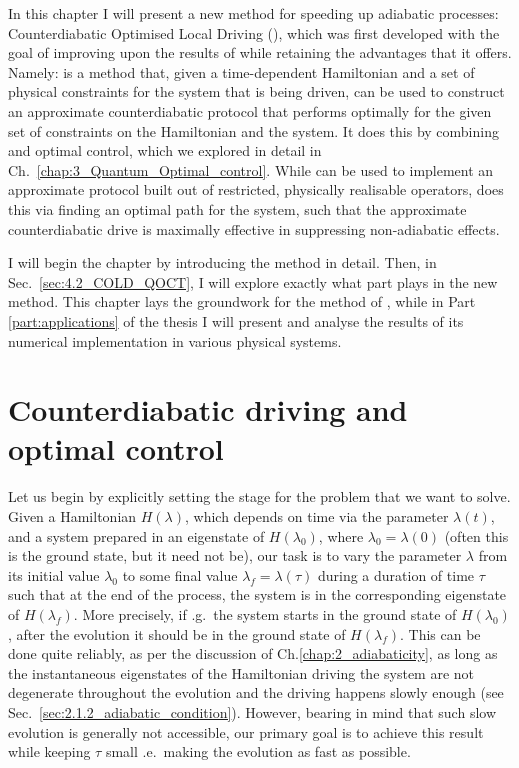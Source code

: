 In this chapter I will present a new method for speeding up adiabatic processes: Counterdiabatic Optimised Local Driving (), which was first developed with the goal of improving upon the results of  while retaining the advantages that it offers. Namely:  is a method that, given a time-dependent Hamiltonian and a set of physical constraints for the system that is being driven, can be used to construct an approximate counterdiabatic protocol that performs optimally for the given set of constraints on the Hamiltonian and the system. It does this by combining  and optimal control, which we explored in detail in Ch.~\ref{chap:3_Quantum_Optimal_control}. While  can be used to implement an approximate  protocol built out of restricted, physically realisable operators,  does this via finding an optimal path for the system, such that the approximate counterdiabatic drive is maximally effective in suppressing non-adiabatic effects.

I will begin the chapter by introducing the  method in detail. Then, in Sec.~\ref{sec:4.2_COLD_QOCT}, I will explore exactly what part  plays in the new method. This chapter lays the groundwork for the method of , while in Part \ref{part:applications} of the thesis I will present and analyse the results of its numerical implementation in various physical systems.

\section{Counterdiabatic driving and optimal control}\label{sec:4.1_COLD}

Let us begin by explicitly setting the stage for the problem that we want to solve. Given a Hamiltonian $H(\lambda)$, which depends on time via the parameter $\lambda(t)$, and a system prepared in an eigenstate of $H(\lambda_0)$, where $\lambda_0 = \lambda(0)$ (often this is the ground state, but it need not be), our task is to vary the parameter $\lambda$ from its initial value $\lambda_0$ to some final value $\lambda_f = \lambda(\tau)$ during a duration of time $\tau$ such that at the end of the process, the system is in the corresponding eigenstate of $H(\lambda_f)$. More precisely, if \@e.g.~the system starts in the ground state of $H(\lambda_0)$, after the evolution it should be in the ground state of $H(\lambda_f)$. This can be done quite reliably, as per the discussion of Ch.\ref{chap:2_adiabaticity}, as long as the instantaneous eigenstates of the Hamiltonian driving the system are not degenerate throughout the evolution and the driving happens slowly enough (see Sec.~\ref{sec:2.1.2_adiabatic_condition}). However, bearing in mind that such slow evolution is generally not accessible, our primary goal is to achieve this result while keeping $\tau$ small \@i.e.~making the evolution as fast as possible. 

